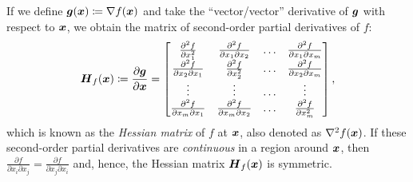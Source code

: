 If we define \(\boldsymbol{g}(\boldsymbol{x}) \coloneqq \nabla f(\boldsymbol{x})\) and take the ``vector/vector'' derivative of \(\boldsymbol{g}\) with respect to \(\boldsymbol{x}\), we obtain the matrix of second-order partial derivatives of \(f\):
\begin{equation}
	\boldsymbol{H}_f(\boldsymbol{x}) \coloneqq \frac{\partial \boldsymbol{g}}{\partial \boldsymbol{x}} =
	\begin{bmatrix}
		\frac{\partial^2 f}{\partial x_1^2}            & \frac{\partial^2 f}{\partial x_1 \partial x_2} & \dots & \frac{\partial^2 f}{\partial x_1 \partial x_m} \\
		\frac{\partial^2 f}{\partial x_2 \partial x_1} & \frac{\partial^2 f}{\partial x_2^2}            & \dots & \frac{\partial^2 f}{\partial x_2 \partial x_m} \\
		\vdots                                         & \vdots                                         & \dots & \vdots                                         \\
		\frac{\partial^2 f}{\partial x_m \partial x_1} & \frac{\partial^2 f}{\partial x_m \partial x_2} & \dots & \frac{\partial^2 f}{\partial x_m^2}
	\end{bmatrix}, \label{eq:HessianMatrix}
\end{equation}
which is known as the \textit{Hessian matrix} of \(f\) at \(\boldsymbol{x}\), also denoted as \(\nabla^2 f(\boldsymbol{x})\). If these second-order partial derivatives are \textit{continuous} in a region around \(\boldsymbol{x}\), then \(\frac{\partial f}{\partial x_i \partial x_j} = \frac{\partial f}{\partial x_j \partial x_i}\) and, hence, the Hessian matrix \(\boldsymbol{H}_f(\boldsymbol{x})\) is symmetric.


